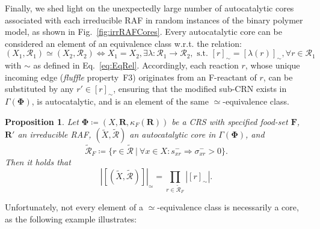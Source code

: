 \documentclass[pdflatex]{sn-jnl}
\theoremstyle{thmstyleone}%
\newtheorem{proposition}[theorem]{Proposition}%
\theoremstyle{examplesty}%
\theoremstyle{thmstylethree}%
\newcommand{\food}{\ensuremath{\mathbf{F}}}
\newcommand{\CRS}{\ensuremath{\mathbf{\Phi}}}
\newcommand{\CR}[0]{\mathcal{R}}
\newcommand{\FR}[0]{\mathbf{R}}
\newcommand{\RAF}[0]{\mathbf{R}'}
\newcommand{\cat}{\kappa_F}
\newcommand{\holy}[1]{\begingroup\color{royalpurple}#1\endgroup}
\begin{document}
\holy{Finally, we shed light on the unexpectedly large number of autocatalytic cores associated with each irreducible RAF in random instances of the binary polymer model, as shown in Fig.~\ref{fig:irrRAFCores}. Every autocatalytic core can be considered an element of an equivalence class w.r.t. the relation: 
\begin{equation}\label{eq:CoreEquiv}
	(X_1,\CR_1)\simeq (X_2,\CR_2) \Leftrightarrow X_1=X_2, \exists \lambda: \CR_1\rightarrow \CR_2, \text{ s.t. } [r]_{\mathord{\sim}}=[\lambda(r)]_{\mathord{\sim}}, \forall r\in \CR_1
\end{equation}
with $\sim$ as defined in Eq.~\eqref{eq:EqRel}. Accordingly, each reaction $r$, whose unique incoming edge (\emph{fluffle} property~F3) originates from an F-reactant of $r$, can be substituted by any $r'\in [r]_\sim$, ensuring that the modified sub-CRN exists in $\Gamma(\CRS)$, is autocatalytic, and is an element of the same $\simeq$-equivalence class. 

\vspace{6pt}
\begin{proposition}\label{prop:ExpoNoCores}
	Let $\mathbf{\Phi}\coloneqq (X, \FR, \cat(\FR))$ be a CRS with specified food-set $\food$, $\RAF$ an irreducible RAF, $(\tilde{X},\tilde{\CR})$ an autocatalytic core in $\Gamma(\mathbf{\Phi})
	$, and 
	\begin{equation}
		\tilde{\CR}_F\coloneqq \{r\in \tilde{\CR} \ \vert \ \forall x\in X: s^-_{xr} \Rightarrow \sigma^-_{xr}>0 \}.
	\end{equation}
	Then it holds that
	\begin{equation}\label{eq:NoEquivAutoCatCycles}
		|[(\tilde{X}, \tilde{\CR})]|_{\mathord{\simeq}} = \prod_{r\in\tilde{\CR}_F}|[r]_{\mathord{\sim}}|.
	\end{equation}
\end{proposition}
\vspace{6pt}

Unfortunately, not every element of a $\simeq$-equivalence class is necessarily a core, as the following example illustrates:

}
\end{document}
